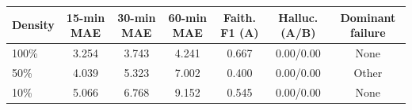 \begin{tabular}{lcccccc}
\toprule
Density & 15-min MAE & 30-min MAE & 60-min MAE & Faith. F1 (A) & Halluc. (A/B) & Dominant failure \\
\midrule
100\% & 3.254 & 3.743 & 4.241 & 0.667 & 0.00/0.00 & None \\
50\% & 4.039 & 5.323 & 7.002 & 0.400 & 0.00/0.00 & Other \\
10\% & 5.066 & 6.768 & 9.152 & 0.545 & 0.00/0.00 & None \\
\bottomrule
\end{tabular}
